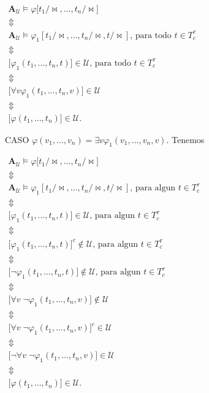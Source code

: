 \(\displaystyle \begin{array}{c} \mathbf{A}_{\mathcal{U}}\models \varphi \lbrack t_{1}/\mathrm{\bowtie } ,...,t_{n}/\mathrm{\bowtie }] \\ \Updownarrow \\ \mathbf{A}_{\mathcal{U}}\models \varphi _{1}[t_{1}/\mathrm{\bowtie } ,...,t_{n}/\mathrm{\bowtie },t/\mathrm{\bowtie }]\text{, para todo }t\in T_{c}^{\tau } \\ \Updownarrow \\ \lbrack \varphi _{1}(t_{1},...,t_{n},t)]\in \mathcal{U}\text{, para todo } t\in T_{c}^{\tau } \\ \Updownarrow \\ \lbrack \forall v\varphi _{1}(t_{1},...,t_{n},v)]\in \mathcal{U} \\ \Updownarrow \\ \lbrack \varphi (t_{1},...,t_{n})]\in \mathcal{U}. \end{array} \)

CASO \(\varphi (v_{1},...,v_{n})=\exists v\varphi _{1}(v_{1},...,v_{n},v).\)
Tenemos

\(\displaystyle \begin{array}{c} \mathbf{A}_{\mathcal{U}}\models \varphi \lbrack t_{1}/\mathrm{\bowtie } ,...,t_{n}/\mathrm{\bowtie }] \\ \Updownarrow \\ \mathbf{A}_{\mathcal{U}}\models \varphi _{1}[t_{1}/\mathrm{\bowtie } ,...,t_{n}/\mathrm{\bowtie },t/\mathrm{\bowtie }]\text{, para algun }t\in T_{c}^{\tau } \\ \Updownarrow \\ \lbrack \varphi _{1}(t_{1},...,t_{n},t)]\in \mathcal{U}\text{, para algun } t\in T_{c}^{\tau } \\ \Updownarrow \\ \lbrack \varphi _{1}(t_{1},...,t_{n},t)]^{c}\not\in \mathcal{U}\text{, para algun }t\in T_{c}^{\tau } \\ \Updownarrow \\ \lbrack \lnot \varphi _{1}(t_{1},...,t_{n},t)]\not\in \mathcal{U}\text{, para algun }t\in T_{c}^{\tau } \\ \Updownarrow \\ \lbrack \forall v\;\lnot \varphi _{1}(t_{1},...,t_{n},v)]\not\in \mathcal{U} \\ \Updownarrow \\ \lbrack \forall v\;\lnot \varphi _{1}(t_{1},...,t_{n},v)]^{c}\in \mathcal{U} \\ \Updownarrow \\ \lbrack \lnot \forall v\;\lnot \varphi _{1}(t_{1},...,t_{n},v)]\in \mathcal{U } \\ \Updownarrow \\ \lbrack \varphi (t_{1},...,t_{n})]\in \mathcal{U}. \end{array} \)

